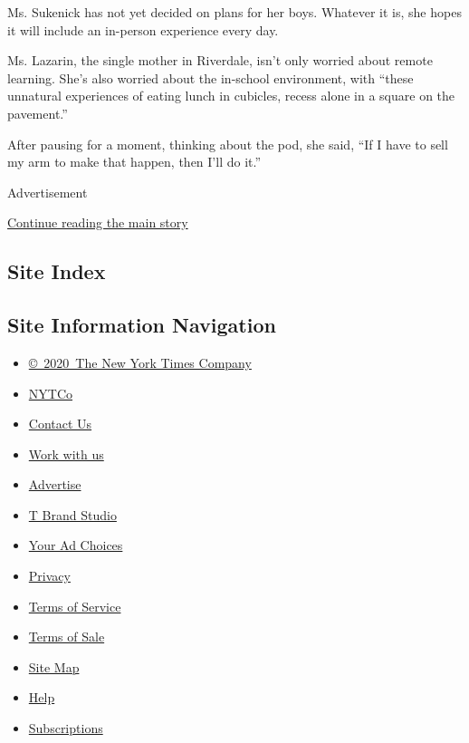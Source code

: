 Ms. Sukenick has not yet decided on plans for her boys. Whatever it is,
she hopes it will include an in-person experience every day.

Ms. Lazarin, the single mother in Riverdale, isn't only worried about
remote learning. She's also worried about the in-school environment,
with ``these unnatural experiences of eating lunch in cubicles, recess
alone in a square on the pavement.''

After pausing for a moment, thinking about the pod, she said, ``If I
have to sell my arm to make that happen, then I'll do it.''

Advertisement

\protect\hyperlink{after-bottom}{Continue reading the main story}

\hypertarget{site-index}{%
\subsection{Site Index}\label{site-index}}

\hypertarget{site-information-navigation}{%
\subsection{Site Information
Navigation}\label{site-information-navigation}}

\begin{itemize}
\tightlist
\item
  \href{https://help.nytimes.com/hc/en-us/articles/115014792127-Copyright-notice}{©~2020~The
  New York Times Company}
\end{itemize}

\begin{itemize}
\tightlist
\item
  \href{https://www.nytco.com/}{NYTCo}
\item
  \href{https://help.nytimes.com/hc/en-us/articles/115015385887-Contact-Us}{Contact
  Us}
\item
  \href{https://www.nytco.com/careers/}{Work with us}
\item
  \href{https://nytmediakit.com/}{Advertise}
\item
  \href{http://www.tbrandstudio.com/}{T Brand Studio}
\item
  \href{https://www.nytimes.com/privacy/cookie-policy\#how-do-i-manage-trackers}{Your
  Ad Choices}
\item
  \href{https://www.nytimes.com/privacy}{Privacy}
\item
  \href{https://help.nytimes.com/hc/en-us/articles/115014893428-Terms-of-service}{Terms
  of Service}
\item
  \href{https://help.nytimes.com/hc/en-us/articles/115014893968-Terms-of-sale}{Terms
  of Sale}
\item
  \href{https://spiderbites.nytimes.com}{Site Map}
\item
  \href{https://help.nytimes.com/hc/en-us}{Help}
\item
  \href{https://www.nytimes.com/subscription?campaignId=37WXW}{Subscriptions}
\end{itemize}
